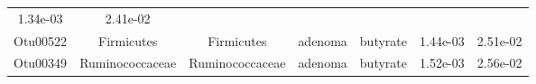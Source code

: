 \documentclass[11pt,]{article}
\begin{document}
\begin{longtable}[]{@{}ccccccc@{}}
\begin{minipage}[t]{0.09\columnwidth}
1.34e-03\strut
\end{minipage} & \begin{minipage}[t]{0.09\columnwidth}\centering\strut
2.41e-02\strut
\end{minipage}\tabularnewline
\begin{minipage}[t]{0.09\columnwidth}\centering\strut
Otu00522\strut
\end{minipage} & \begin{minipage}[t]{0.17\columnwidth}\centering\strut
Firmicutes\strut
\end{minipage} & \begin{minipage}[t]{0.17\columnwidth}\centering\strut
Firmicutes\strut
\end{minipage} & \begin{minipage}[t]{0.09\columnwidth}\centering\strut
adenoma\strut
\end{minipage} & \begin{minipage}[t]{0.11\columnwidth}\centering\strut
butyrate\strut
\end{minipage} & \begin{minipage}[t]{0.09\columnwidth}\centering\strut
1.44e-03\strut
\end{minipage} & \begin{minipage}[t]{0.09\columnwidth}\centering\strut
2.51e-02\strut
\end{minipage}\tabularnewline
\begin{minipage}[t]{0.09\columnwidth}\centering\strut
Otu00349\strut
\end{minipage} & \begin{minipage}[t]{0.17\columnwidth}\centering\strut
Ruminococcaceae\strut
\end{minipage} & \begin{minipage}[t]{0.17\columnwidth}\centering\strut
Ruminococcaceae\strut
\end{minipage} & \begin{minipage}[t]{0.09\columnwidth}\centering\strut
adenoma\strut
\end{minipage} & \begin{minipage}[t]{0.11\columnwidth}\centering\strut
butyrate\strut
\end{minipage} & \begin{minipage}[t]{0.09\columnwidth}\centering\strut
1.52e-03\strut
\end{minipage} & \begin{minipage}[t]{0.09\columnwidth}\centering\strut
2.56e-02\strut
\end{minipage}\tabularnewline

\end{longtable}
\end{document}
